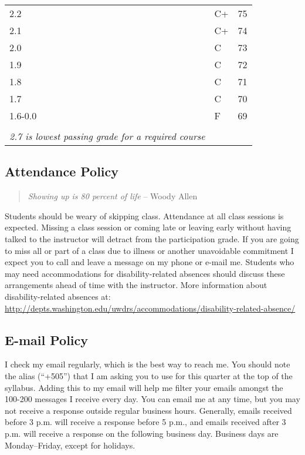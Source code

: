 \documentclass[11pt,]{article}
\begin{document}
\begin{table}[]
\begin{tabular}{lll}
2.2                           & C+           & 75     \\
2.1                           & C+           & 74     \\
2.0                           & C            & 73     \\
1.9                           & C            & 72     \\
1.8                           & C            & 71     \\
1.7                           & C            & 70     \\
1.6-0.0                       & F            & 69     \\
\\
\textit{2.7 is lowest passing grade for a required course}
\end{tabular}
\end{table}

\subsection{Attendance Policy}\label{attendance-policy}

\begin{quote}
\emph{Showing up is 80 percent of life} -- Woody Allen
\end{quote}

Students should be weary of skipping class. Attendance at all class
sessions is expected. Missing a class session or coming late or leaving
early without having talked to the instructor will detract from the
participation grade. If you are going to miss all or part of a class due
to illness or another unavoidable commitment I expect you to call and
leave a message on my phone or e-mail me. Students who may need
accommodations for disability-related absences should discuss these
arrangements ahead of time with the instructor. More information about
disability-related absences at:
\url{http://depts.washington.edu/uwdrs/accommodations/disability-related-absence/}

\subsection{E-mail Policy}\label{e-mail-policy}

I check my email regularly, which is the best way to reach me. You
should note the alias (``+505'') that I am asking you to use for this
quarter at the top of the syllabus. Adding this to my email will help me
filter your emails amongst the 100-200 messages I receive every day. You
can email me at any time, but you may not receive a response outside
regular business hours. Generally, emails received before 3 p.m. will
receive a response before 5 p.m., and emails received after 3 p.m. will
receive a response on the following business day. Business days are
Monday--Friday, except for holidays.
\end{document}
